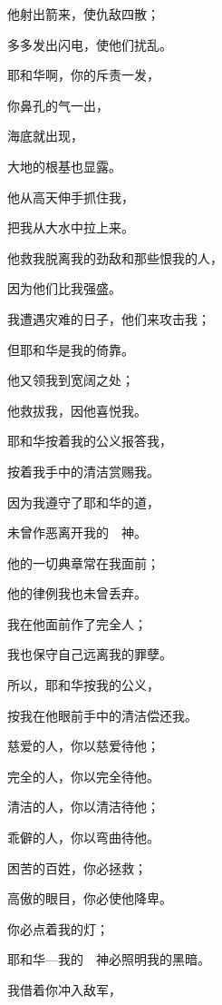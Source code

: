 {\par }{\Q {}他射出箭来，使仇敌四散；
\par }{\Q 多多发出闪电，使他们扰乱。
\par }{\Q {}耶和华啊，你的斥责一发，
\par }{\Q 你鼻孔的气一出，
\par }{\Q 海底就出现，
\par }{\Q 大地的根基也显露。
\par }{\Q {}他从高天伸手抓住我，
\par }{\Q 把我从大水中拉上来。
\par }{\Q {}他救我脱离我的劲敌和那些恨我的人，
\par }{\Q 因为他们比我强盛。
\par }{\Q {}我遭遇灾难的日子，他们来攻击我；
\par }{\Q 但耶和华是我的倚靠。
\par }{\Q {}他又领我到宽阔之处；
\par }{\Q 他救拔我，因他喜悦我。
\par }{\BB \par }{\Q {}耶和华按着我的公义报答我，
\par }{\Q 按着我手中的清洁赏赐我。
\par }{\Q {}因为我遵守了耶和华的道，
\par }{\Q 未曾作恶离开我的　神。
\par }{\Q {}他的一切典章常在我面前；
\par }{\Q 他的律例我也未曾丢弃。
\par }{\Q {}我在他面前作了完全人；
\par }{\Q 我也保守自己远离我的罪孽。
\par }{\Q {}所以，耶和华按我的公义，
\par }{\Q 按我在他眼前手中的清洁偿还我。
\par }{\BB \par }{\Q {}慈爱的人，你以慈爱待他；
\par }{\Q 完全的人，你以完全待他。
\par }{\Q {}清洁的人，你以清洁待他；
\par }{\Q 乖僻的人，你以弯曲待他。
\par }{\Q {}困苦的百姓，你必拯救；
\par }{\Q 高傲的眼目，你必使他降卑。
\par }{\Q {}你必点着我的灯；
\par }{\Q 耶和华—我的　神必照明我的黑暗。
\par }{\Q {}我借着你冲入敌军，
}

